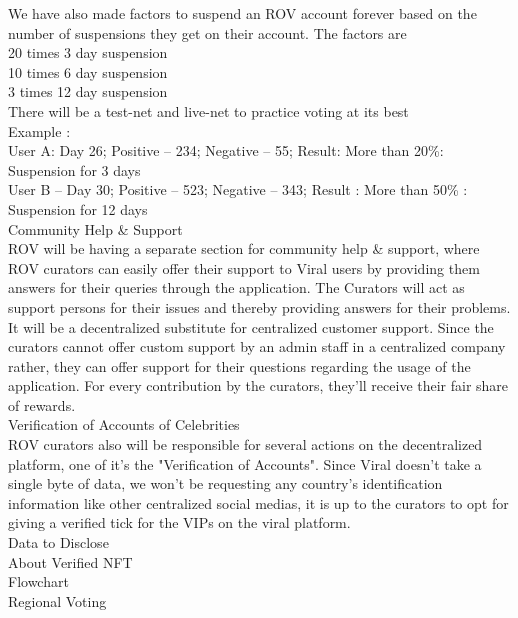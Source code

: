 \documentclass[10pt]{article}
\begin{document}
We have also made factors to suspend an ROV account forever based on the number of suspensions they get on their account. The factors are\\

 20 times 3 day suspension \\
 10 times 6 day suspension\\
 3 times 12 day suspension\\

There will be a test-net and live-net to practice voting at its best\\

Example : \\

User A: Day 26; Positive – 234; Negative – 55; Result: More than 20\%: Suspension for 3 days\\
User B – Day 30; Positive – 523; Negative – 343; Result : More than 50\% : Suspension for 12 days\\


Community Help \& Support\\

ROV will be having a separate section for community help \& support, where ROV curators can easily offer their support to Viral users by providing them answers for their queries through the application. The Curators will act as support persons for their issues and thereby providing answers for their problems. It will be a decentralized substitute for centralized customer support. Since the curators cannot offer custom support by an admin staff in a centralized company rather, they can offer support for their questions regarding the usage of the application. For every contribution by the curators, they’ll receive their fair share of rewards.\\


Verification of Accounts of Celebrities\\

ROV curators also will be responsible for several actions on the decentralized platform, one of it's the "Verification of Accounts". Since Viral doesn’t take a single byte of data, we won’t be requesting any country’s identification information like other centralized social medias, it is up to the curators to opt for giving a verified tick for the VIPs on the viral platform.\\

Data to Disclose\\
About Verified NFT\\
Flowchart\\
Regional Voting\\
\end{document}
